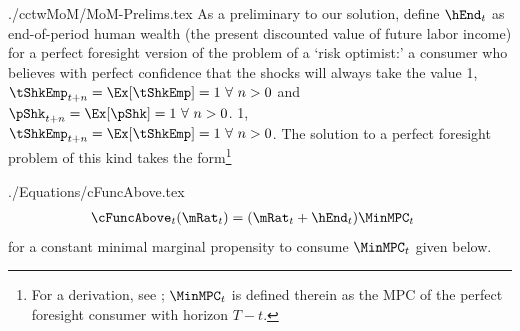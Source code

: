 \documentclass[titlepage]{\econtex}
\newcommand{\pShkOn}{\ifthenelse{\boolean{pShkVersion}}}
\begin{document}
\begin{verbatimwrite}{./cctwMoM/MoM-Prelims.tex}
  As a preliminary to our solution, define $\hEnd_{t}$ as
  end-of-period human wealth (the present discounted value
  of future labor income) for a perfect foresight version of the problem
  of a `risk optimist:' a consumer who believes with perfect confidence
  that the shocks will always take the value 
  \pShkOn
  {1, $\tShkEmp_{t+n} = \Ex[\tShkEmp]=1~\forall~n>0$ and $\pShk_{t+n} = \Ex[\pShk]=1~\forall~n>0$.}
  {1, $\tShkEmp_{t+n} = \Ex[\tShkEmp]=1~\forall~n>0$.}
  The solution to a perfect foresight problem of this kind takes the
  form\footnote{For a derivation, see \cite{BufferStockTheory}; $\MinMPC_{t}$ is defined therein as the MPC of the perfect foresight consumer with horizon $T-t$.}
\end{verbatimwrite}

\begin{verbatimwrite}{./Equations/cFuncAbove.tex}
  \begin{equation}\begin{gathered}\begin{aligned}
    \cFuncAbove_{t}(\mRat_{t})  & = (\mRat_{t} + \hEnd_{t})\MinMPC_{t} \label{eq:cFuncAbove}
  \end{aligned}\end{gathered}\end{equation}
  for a constant minimal marginal propensity to consume $\MinMPC_{t}$ given below.
\end{verbatimwrite}

\end{document}
